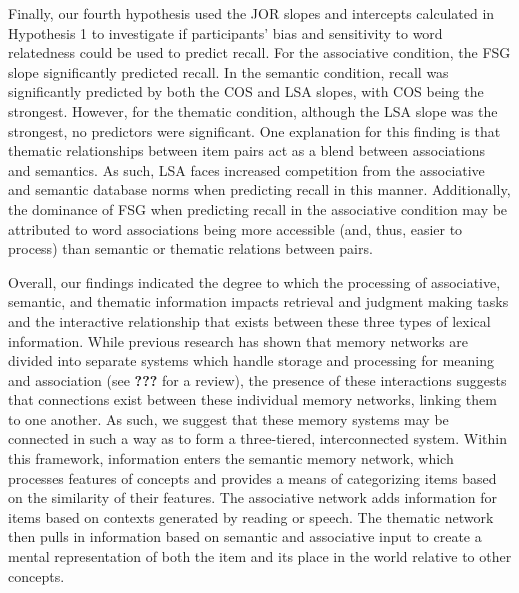 \documentclass[english,,man]{apa6}
\begin{document}
Finally, our fourth hypothesis used the JOR slopes and intercepts
calculated in Hypothesis 1 to investigate if participants' bias and
sensitivity to word relatedness could be used to predict recall. For the
associative condition, the FSG slope significantly predicted recall. In
the semantic condition, recall was significantly predicted by both the
COS and LSA slopes, with COS being the strongest. However, for the
thematic condition, although the LSA slope was the strongest, no
predictors were significant. One explanation for this finding is that
thematic relationships between item pairs act as a blend between
associations and semantics. As such, LSA faces increased competition
from the associative and semantic database norms when predicting recall
in this manner. Additionally, the dominance of FSG when predicting
recall in the associative condition may be attributed to word
associations being more accessible (and, thus, easier to process) than
semantic or thematic relations between pairs.

Overall, our findings indicated the degree to which the processing of
associative, semantic, and thematic information impacts retrieval and
judgment making tasks and the interactive relationship that exists
between these three types of lexical information. While previous
research has shown that memory networks are divided into separate
systems which handle storage and processing for meaning and association
(see {\textbf{???}} for a review), the presence of these interactions
suggests that connections exist between these individual memory
networks, linking them to one another. As such, we suggest that these
memory systems may be connected in such a way as to form a three-tiered,
interconnected system. Within this framework, information enters the
semantic memory network, which processes features of concepts and
provides a means of categorizing items based on the similarity of their
features. The associative network adds information for items based on
contexts generated by reading or speech. The thematic network then pulls
in information based on semantic and associative input to create a
mental representation of both the item and its place in the world
relative to other concepts.
\end{document}
